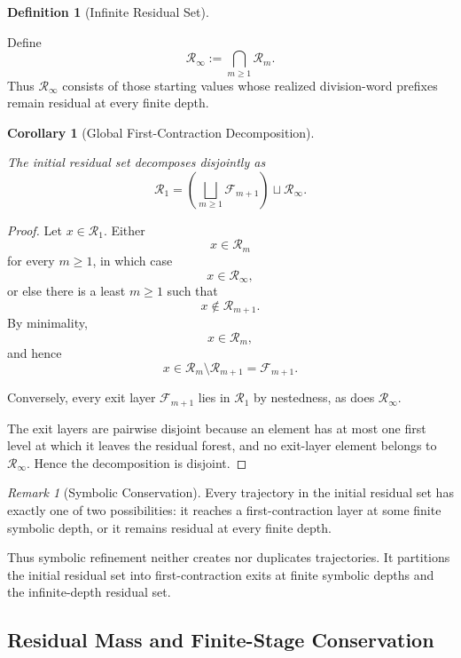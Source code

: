 \documentclass[12pt, oneside]{article}
\numberwithin{equation}{section}
\theoremstyle{definition}
\newtheorem{definition}{Definition}[section]
\theoremstyle{plain}
\newtheorem{corollary}[theorem]{Corollary}
\theoremstyle{remark}
\newtheorem*{remark}{Remark}
\begin{document}
\begin{definition}[Infinite Residual Set]
\label{def:infinite-residual-set}

Define
\[
\mathcal R_\infty
:=
\bigcap_{m\ge1}\mathcal R_m.
\]
Thus \(\mathcal R_\infty\) consists of those starting values whose realized
division-word prefixes remain residual at every finite depth.
\end{definition}

\begin{corollary}[Global First-Contraction Decomposition]
\label{cor:global-first-contraction-decomposition}

The initial residual set decomposes disjointly as
\[
\boxed{
\mathcal R_1
=
\left(
\bigsqcup_{m\ge1}\mathcal F_{m+1}
\right)
\sqcup
\mathcal R_\infty.
}
\]
\end{corollary}

\begin{proof}
Let \(x\in\mathcal R_1\). Either
\[
x\in\mathcal R_m
\]
for every \(m\ge1\), in which case
\[
x\in\mathcal R_\infty,
\]
or else there is a least \(m\ge1\) such that
\[
x\notin\mathcal R_{m+1}.
\]
By minimality,
\[
x\in\mathcal R_m,
\]
and hence
\[
x\in
\mathcal R_m\setminus\mathcal R_{m+1}
=
\mathcal F_{m+1}.
\]

Conversely, every exit layer \(\mathcal F_{m+1}\) lies in
\(\mathcal R_1\) by nestedness, as does \(\mathcal R_\infty\).

The exit layers are pairwise disjoint because an element has at most one
first level at which it leaves the residual forest, and no exit-layer
element belongs to \(\mathcal R_\infty\). Hence the decomposition is
disjoint.
\end{proof}

\begin{remark}[Symbolic Conservation]
Every trajectory in the initial residual set has exactly one of two
possibilities: it reaches a first-contraction layer at some finite symbolic
depth, or it remains residual at every finite depth.

Thus symbolic refinement neither creates nor duplicates trajectories. It
partitions the initial residual set into first-contraction exits at finite
symbolic depths and the infinite-depth residual set.
\end{remark}

\subsection{Residual Mass and Finite-Stage Conservation}
\end{document}
